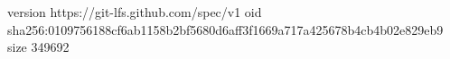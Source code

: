 version https://git-lfs.github.com/spec/v1
oid sha256:0109756188cf6ab1158b2bf5680d6aff3f1669a717a425678b4cb4b02e829eb9
size 349692
